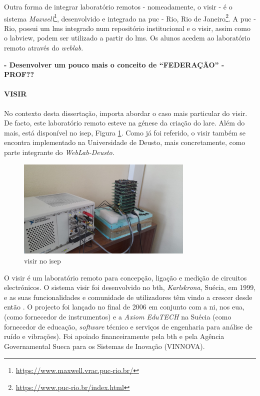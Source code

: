 Outra forma de integrar \acrshort{laboratório remoto}s - nomeadamente, o \acrshort{visir} - é o sistema \textit{Maxwell}\footnote{\url{https://www.maxwell.vrac.puc-rio.br/}}, desenvolvido e integrado na \acrfull{puc} - Rio, Rio de Janeiro\footnote{\url{https://www.puc-rio.br/index.html}}. A \acrshort{puc} - Rio, possui um \acrshort{lms} integrado num repositório institucional e o \acrshort{visir}, assim como o \acrshort{labview}, podem ser utilizado a partir do \acrshort{lms}. Os alunos acedem ao \acrshort{laboratório remoto} através do \textit{weblab}\cite{Alves}.

\textbf{- Desenvolver um pouco mais o conceito de ``FEDERAÇÃO'' - PROF??}

\paragraph{VISIR}
\label{sec:visir}
No contexto desta dissertação, importa abordar o caso mais particular do \acrshort{visir}. De facto, este \acrshort{laboratório remoto} esteve na génese da criação do \acrshort{lare}. Além do mais, está disponível no \acrshort{isep}, Figura \ref{fig:visirISEP}. Como já foi referido, o \acrshort{visir} também se encontra implementado na Universidade de Deusto, mais concretamente, como parte integrante do \textit{WebLab-Deusto}. 

\begin{figure}[hbtp]
    \centering
    \includegraphics[width=0.75\textwidth]{figures/visirISEP.jpeg}
    \caption{\acrshort{visir} no \acrshort{isep}}
    \label{fig:visirISEP}
\end{figure}

O \acrshort{visir} é um \acrshort{laboratório remoto} para concepção, ligação e medição de circuitos electrónicos. O sistema \acrshort{visir} foi desenvolvido no \acrfull{bth}, \textit{Karlskrona}, Suécia, em 1999, e as suas funcionalidades e comunidade de utilizadores têm vindo a crescer desde então \cite{RemoteLabsImpactVISIR}. O projecto foi lançado no final de 2006 em conjunto com a \acrshort{ni}, nos \acrshort{eua}, (como fornecedor de instrumentos) e a \textit{Axiom EduTECH} na Suécia (como fornecedor de educação, \textit{software} técnico e serviços de engenharia para análise de ruído e vibrações). Foi apoiado financeiramente pela \acrshort{bth} e pela Agência Governamental Sueca para os Sistemas de Inovação (VINNOVA)\cite{VISIRExperiencesChallenges}.

